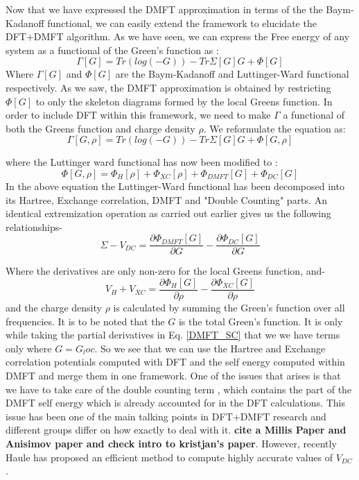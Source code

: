 \documentclass[10pt]{ruthesis}
\begin{document}
Now that we have expressed the DMFT approximation in terms of the the Baym-Kadanoff functional, we can easily extend the framework to elucidate the DFT+DMFT algorithm. As we have seen, we can express the Free energy of any system as a functional of the Green's function as :
\begin{equation}
\Gamma[G]= Tr(log(-G)) -Tr \Sigma[G]G +\Phi[G]
\end{equation}
Where $\Gamma[G]$ and $\Phi[G]$ are the Baym-Kadanoff and Luttinger-Ward functional respectively. As we saw, the DMFT approximation is obtained by restricting $\Phi[G]$ to only the skeleton diagrams formed by the local Greens function. In order to include DFT within this framework, we need to make $\Gamma$ a functional of both the Greens function and charge density $\rho$. We reformulate the equation as:
\begin{equation}
 \Gamma[G,\rho]= Tr(log(-G)) -Tr \Sigma[G]G +\Phi[G,\rho]
\end{equation}  
 
 where the Luttinger ward functional has now been modified to :
 \begin{equation}
 \Phi[G,\rho]=\Phi_{H}[\rho]+\Phi_{XC}[\rho]+\Phi_{DMFT}[G]+\Phi_{DC}[G]
 \end{equation}
 In the above equation the Luttinger-Ward functional has been decomposed into its Hartree, Exchange correlation, DMFT and "Double Counting" parts.  An identical extremization operation as carried out earlier gives us the following relationships-
\begin{equation}\label{DMFT_SC}
 \Sigma-V_{DC}=  \dfrac{\partial \Phi_{DMFT}[G]}{\partial G}- \dfrac{\partial \Phi_{DC}[G]}{\partial G}
 \end{equation} 
 
 Where the derivatives are only non-zero for the local Greens function, and-
 \begin{equation}
V_H+V_{XC}=\dfrac{\partial \Phi_{H}[G]}{\partial \rho}- \dfrac{\partial \Phi_{XC}[G]}{\partial \rho}
 \end{equation}
 and the charge density $\rho$ is calculated by summing the Green's function over all frequencies. It is to be noted that the $G$ is the total Green's function. It is only while taking the partial derivatives in Eq. \ref{DMFT_SC} that we we have terms only where $G=G_loc$. So we see that we can use the Hartree and Exchange correlation potentials computed with DFT and the self energy computed within DMFT and merge them in one framework. One of the issues that arises is that we have to take care of the double counting term , which contains the part of the DMFT self energy which is already accounted for in the DFT calculations. This issue has been one of the main talking points in DFT+DMFT research and different groups differ on how exactly to deal with it. \textbf{cite a Millis Paper and Anisimov paper and check intro to kristjan's paper}. However, recently Haule has proposed an efficient method to compute highly accurate values of $V_{DC} $.
 
\end{document}
